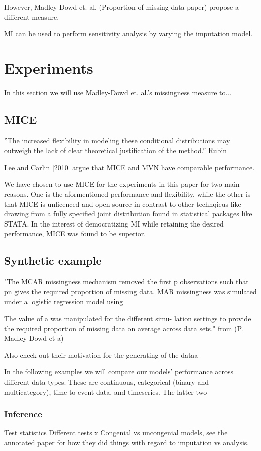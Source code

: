 \documentclass{article}
\begin{document}
	However, Madley-Dowd et. al. (Proportion of missing data paper) propose a different measure.
	
	MI can be used to perform sensitivity analysis by varying the imputation model.
	
	\section{Experiments}
	In this section we will use Madley-Dowd et. al.'s missingness measure to...
	
	\subsection{MICE}
	''The
	increased flexibility in modeling these conditional distributions may outweigh
	the lack of clear theoretical justification of the method.'' Rubin
	
	Lee and Carlin  [2010] argue that MICE and MVN have comparable performance.
	
	We have chosen to use MICE for the experiments in this paper for two main reasons. One is the aformentioned performance and flexibility, while the other is that MICE is unlicenced and open source in contrast to other technqieus like drawing from a fully specified joint distribution found in statistical packages like STATA. In the interest of democratizing MI while retaining the desired performance, MICE was found to be superior.
	
	\subsection{Synthetic example}
	
	"The MCAR missingness mechanism
	removed the first p observations such that pn gives the
	required proportion of missing data. MAR missingness
	was simulated under a logistic regression model using
	
	The value of a was manipulated for the different simu-
	lation settings to provide the required proportion of missing
	data on average across data sets." from (P. Madley-Dowd et a)
	
	Also check out their motivation for the generating of the dataa
	
	
	In the following examples we will compare our models' performance across different data types. These are continuous, categorical (binary and multicategory), time to event data, and timeseries. The latter two 
	
	\subsubsection{Inference}
	Test statistics
	Different tests
	x
	Congenial vs uncongenial models, see the annotated paper for how they did things with regard to imputation vs analysis. 
	
\end{document}
